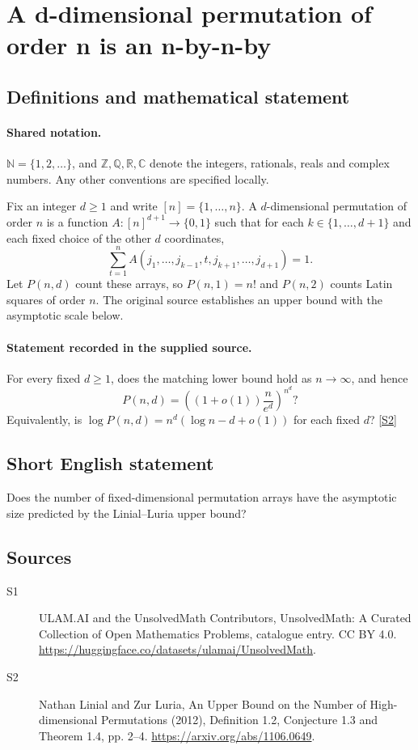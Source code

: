 \documentclass[11pt]{article}
\newcommand{\sref}[2]{\hyperlink{source:#1:#2}{[S#2]}}
\begin{document}
\section{A d-dimensional permutation of order n is an n-by-n-by}\label{statement}

\subsection{Definitions and mathematical statement}

\paragraph{Shared notation.}$\mathbb N=\{1,2,\ldots\}$, and $\mathbb Z,\mathbb Q,\mathbb R,\mathbb C$ denote the integers, rationals, reals and complex numbers. Any other conventions are specified locally.


Fix an integer $d\geq1$ and write $[n]=\{1,\ldots,n\}$. A $d$-dimensional permutation of order $n$ is a function $A:[n]^{d+1}\to\{0,1\}$ such that for each $k\in\{1,\ldots,d+1\}$ and each fixed choice of the other $d$ coordinates,
\[\sum_{t=1}^n A(j_1,\ldots,j_{k-1},t,j_{k+1},\ldots,j_{d+1})=1.\]
Let $P(n,d)$ count these arrays, so $P(n,1)=n!$ and $P(n,2)$ counts Latin squares of order $n$. The original source establishes an upper bound with the asymptotic scale below.
\paragraph{Statement recorded in the supplied source.}
For every fixed $d\geq1$, does the matching lower bound hold as $n\to\infty$, and hence
\[P(n,d)=\left((1+o(1))\frac{n}{e^d}\right)^{n^d}?\]
Equivalently, is $\log P(n,d)=n^d(\log n-d+o(1))$ for each fixed $d$? \sref{statement}{2}
\subsection{Short English statement}
Does the number of fixed-dimensional permutation arrays have the asymptotic size predicted by the Linial--Luria upper bound?
\subsection{Sources}
\begin{description}
\item[\hypertarget{source:statement:1}{S1}] ULAM.AI and the UnsolvedMath Contributors, UnsolvedMath: A Curated Collection of Open Mathematics Problems, catalogue entry. CC BY 4.0. \url{https://huggingface.co/datasets/ulamai/UnsolvedMath}.
\item[\hypertarget{source:statement:2}{S2}] Nathan Linial and Zur Luria, An Upper Bound on the Number of High-dimensional Permutations (2012), Definition 1.2, Conjecture 1.3 and Theorem 1.4, pp. 2--4. \url{https://arxiv.org/abs/1106.0649}.
\end{description}
\label{end:statement}
\end{document}
